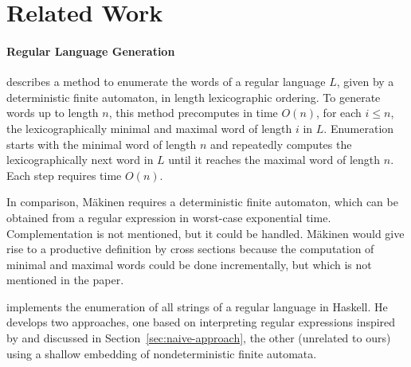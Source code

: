 \section{Related Work}
\label{sec:related-work}

\paragraph{Regular Language Generation}

\citet{DBLP:journals/actaC/Makinen97} describes a method to enumerate
the words of a regular language $L$, given by a deterministic finite
automaton, in length lexicographic ordering. To generate words up to
length $n$, this method precomputes in time $O(n)$, for each $i\le n$,
the lexicographically minimal and maximal word of length $i$ in $L$.
%
Enumeration starts with the minimal word of
length $n$ and repeatedly computes the lexicographically next word in $L$
until it reaches the maximal word of length $n$. Each step requires time $O(n)$. 


In comparison, M{\"{a}}kinen requires a deterministic
finite automaton, which can be obtained from a regular expression in
worst-case exponential time. Complementation is not mentioned, but it
could be handled. M{\"{a}}kinen would give rise to a
productive definition by cross sections because the computation of minimal
and maximal words could be done incrementally, but which is not mentioned
in the paper.


\citet{DBLP:journals/jfp/McIlroy04} implements the enumeration of all
strings of a regular language in Haskell. He develops two approaches,
one based on interpreting regular expressions inspired by
\citet{misra11:_enumer_strin_regul_expres} and discussed in
Section~\ref{sec:naive-approach}, the other (unrelated to ours) using
a shallow embedding of nondeterministic finite automata.


